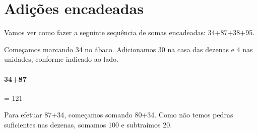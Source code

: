 \documentclass[12pt]{book}
\begin{document}
\section{Adições encadeadas}

Vamos ver como fazer a seguinte sequência
de somas encadeadas: 34+87+38+95.\\

\begin{minipage}{0.4\textwidth}
\end{minipage}%
%
\begin{minipage}{0.5\textwidth}
  Começamos marcando 34 no ábaco.
  Adicionamos 30 na casa das
  dezenas e 4 nas unidades,
  conforme indicado ao lado.
\end{minipage}


\vspace{0.5cm}
\paragraph{34+87}= 121\\

\begin{minipage}{0.4\textwidth}
\end{minipage}%
%
\begin{minipage}{0.5\textwidth}
  Para efetuar 87+34, começamos somando 80+34.
  Como não temos pedras suficientes nas
  dezenas, somamos 100 e subtraímos 20.
\end{minipage}
\end{document}
